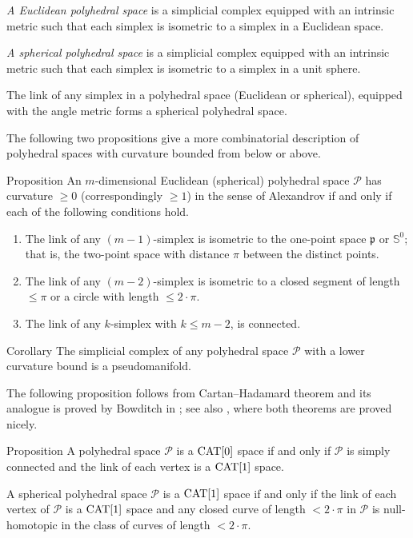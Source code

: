 \documentclass{compositio}
\begin{document}
\emph{A Euclidean polyhedral space} is a simplicial complex equipped with an intrinsic metric such that each simplex is isometric to a simplex in a Euclidean space.

\emph{A spherical polyhedral space} is a simplicial complex equipped with an intrinsic metric such that each simplex is isometric to a simplex in a unit sphere.

The link of any simplex in a polyhedral space
(Euclidean or spherical),
equipped with the angle metric forms a spherical polyhedral space.

The following two propositions give a more combinatorial description of polyhedral spaces with curvature bounded from below or above.

\begin{thm}{Proposition}\label{prop:poly-cbb}
An $m$-dimensional Euclidean (spherical) polyhedral space $\mathcal{P}$
has curvature $\ge 0$ (correspondingly $\ge 1$)
in the sense of Alexandrov
if and only if each of the following conditions hold.
\begin{enumerate}
\item The link of any $(m-1)$-simplex is isometric to the one-point space $\mathfrak{p}$ or $\mathbb{S}^0$; 
that is, the two-point space with distance $\pi$ between the distinct points.
\item The link of any $(m-2)$-simplex is isometric to a closed segment of length $\le \pi$ or a circle with length $\le2\cdot\pi$.
\item The link of any $k$-simplex with $k\le m-2$, is connected.
\end{enumerate}

\end{thm}

\begin{thm}{Corollary}
The simplicial complex of any polyhedral space $\mathcal{P}$ with a lower curvature bound is a pseudomanifold.
\end{thm}

The following proposition
follows from Cartan--Hadamard theorem
and its analogue is proved by Bowditch in \cite{bowditch};
see also \cite{akp}, where both theorems are proved nicely.

\begin{thm}{Proposition}\label{prop:poly-cba}
A  polyhedral space $\mathcal{P}$ is a $\mathrm{CAT}[0]$ space
if and only if $\mathcal{P}$ is simply connected
and the link of each vertex is a $\mathrm{CAT}[1]$ space.

A spherical polyhedral space $\mathcal{P}$
is a $\mathrm{CAT}[1]$ space
if and only if  the link of each vertex of $\mathcal{P}$ is a $\mathrm{CAT}[1]$ space
and any closed curve of length $<2\cdot\pi$ in $\mathcal{P}$ is null-homotopic in the class of curves of length $<2\cdot\pi$.
\end{thm}
\end{document}
